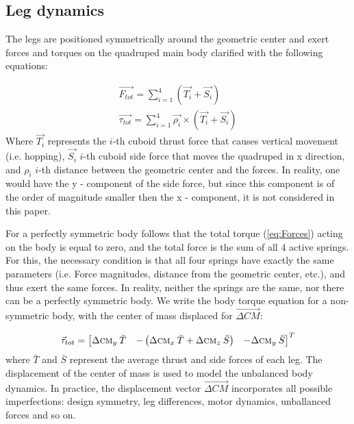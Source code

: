 \subsection{Leg dynamics}


The legs are positioned symmetrically around the geometric center and exert forces and torques on the quadruped main body clarified with the following equations:

\begin{gather}\label{eq:Forces}
\vec{F_{tot}}=\sum_{i=1}^{4}(\vec{T_{i}}+\vec{S_{i}})\\
\vec{\tau_{tot}}=\sum_{i=1}^{4}\vec{\rho _i}\times(\vec{T_{i}}+\vec{S_{i}})
\end{gather}  
Where $\vec{T_{i}}$ represents the $i$-th cuboid thrust force that causes vertical movement (i.e. hopping), $\vec{S_{i}}$ $i$-th cuboid side force that moves the quadruped in x direction, and $\rho _i$ $i$-th distance between the geometric center and the forces. In reality, one would have the y - component of the side force, but since this component is of the order of magnitude smaller then the x - component, it is not considered in this paper.

For a perfectly symmetric body follows that the total torque (\ref{eq:Forces}) acting on the body is equal to zero, and the total force is the sum of all 4 active springs. For this, the necessary condition is that all four springs have exactly the same parameters (i.e. Force magnitudes, distance from the geometric center, etc.), and thus exert the same forces. In reality, neither the springs are the same, nor there can be a perfectly symmetric body. We write the body torque equation for a non-symmetric body, with the center of mass displaced for $\vec{\Delta CM}$:

\begin{equation}\label{eq:Torques}
\vec{\tau}_{tot}=\begin{bmatrix}
\Delta \textsc{cm}_y \:\bar{T} & -\left ( \Delta \textsc{cm}_x \:\bar{T} +\Delta \textsc{cm}_z \:\bar{S}\right ) & -\Delta \textsc{cm}_y \:\bar{S}
\end{bmatrix}^T
\end{equation}
where $\bar{T}$ and $\bar{S}$ represent the average thrust and side forces of each leg. The displacement of the center of mass is used to model the unbalanced body dynamics. In practice, the displacement vector  $\vec{\Delta CM}$ incorporates all possible imperfections: design symmetry, leg differences, motor dynamics, unballanced forces and so on.

